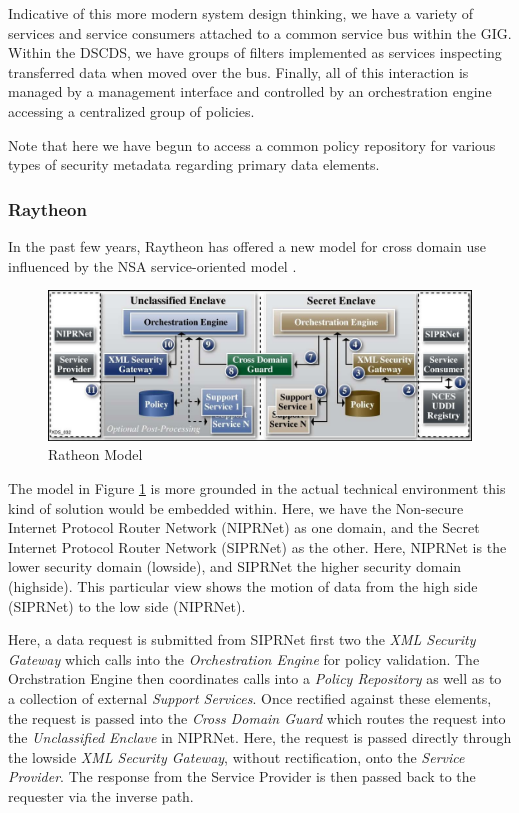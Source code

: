 \documentclass[12pt,letterpaper]{article}
\begin{document}
Indicative of this more modern system design thinking, we have a variety of services and service consumers attached to a common service bus within the GIG.  Within the DSCDS, we have groups of filters implemented as services inspecting transferred data when moved over the bus.  Finally, all of this interaction is managed by a management interface and controlled by an orchestration engine accessing a centralized group of policies.

Note that here we have begun to access a common policy repository for various types of security metadata regarding primary data elements.

\subsubsection{Raytheon}
In the past few years, Raytheon has offered a new model for cross domain use influenced by the NSA service-oriented model \cite{proposal:raytheon-arch}.

\begin{figure}[!t]
\centering
\includegraphics[width=5in]{raytheon-arch}
\caption{Ratheon Model}
\label{fig:model:conceptual-model-ray}
\end{figure}

The model in Figure \ref{fig:model:conceptual-model-ray}   is more grounded in the actual technical environment this kind of solution would be embedded within.  Here, we have the Non-secure Internet Protocol Router Network (NIPRNet) as one domain, and the Secret Internet Protocol Router Network (SIPRNet) as the other.  Here, NIPRNet is the lower security domain (lowside), and SIPRNet the higher security domain (highside).  This particular view shows the motion of data from the high side (SIPRNet) to the low side (NIPRNet).

Here, a data request is submitted from SIPRNet first two the \textit{XML Security Gateway} which calls into the \textit{Orchestration Engine} for policy validation.  The Orchstration Engine then coordinates calls into a \textit{Policy Repository} as well as to a collection of external \textit{Support Services}.  Once rectified against these elements, the request is passed into the \textit{Cross Domain Guard} which routes the request into the \textit{Unclassified Enclave} in NIPRNet.  Here, the request is passed directly through the lowside \textit{XML Security Gateway}, without rectification, onto the \textit{Service Provider}.  The response from the Service Provider is then passed back to the requester via the inverse path.
\end{document}

